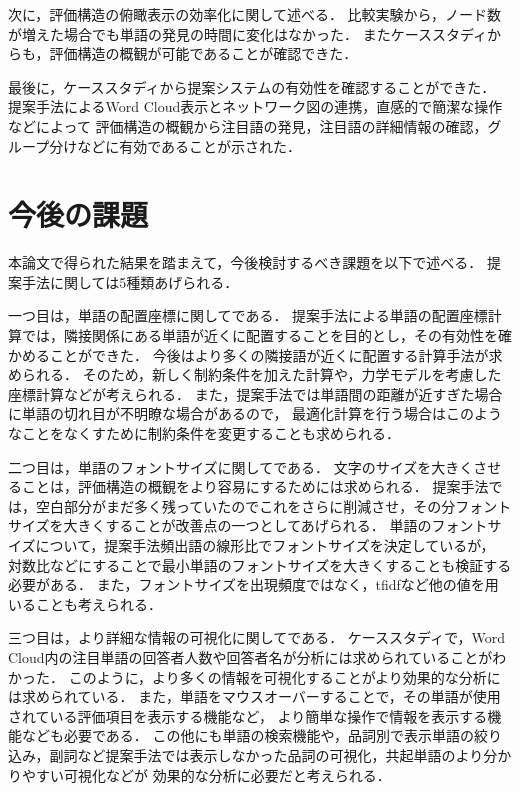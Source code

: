 \documentclass[syuuron]{kuee}
\begin{document}
		次に，評価構造の俯瞰表示の効率化に関して述べる．
		比較実験から，ノード数が増えた場合でも単語の発見の時間に変化はなかった．
		またケーススタディからも，評価構造の概観が可能であることが確認できた．
		
		最後に，ケーススタディから提案システムの有効性を確認することができた．
		提案手法によるWord Cloud表示とネットワーク図の連携，直感的で簡潔な操作などによって
		評価構造の概観から注目語の発見，注目語の詳細情報の確認，グループ分けなどに有効であることが示された．		
		
	\section{今後の課題}
		本論文で得られた結果を踏まえて，今後検討するべき課題を以下で述べる．
		提案手法に関しては5種類あげられる．
		
		一つ目は，単語の配置座標に関してである．
		提案手法による単語の配置座標計算では，隣接関係にある単語が近くに配置することを目的とし，その有効性を確かめることができた．
		今後はより多くの隣接語が近くに配置する計算手法が求められる．
		そのため，新しく制約条件を加えた計算や，力学モデルを考慮した座標計算などが考えられる．
		また，提案手法では単語間の距離が近すぎた場合に単語の切れ目が不明瞭な場合があるので，
		最適化計算を行う場合はこのようなことをなくすために制約条件を変更することも求められる．
		
		二つ目は，単語のフォントサイズに関してである．
		文字のサイズを大きくさせることは，評価構造の概観をより容易にするためには求められる．
		提案手法では，空白部分がまだ多く残っていたのでこれをさらに削減させ，その分フォントサイズを大きくすることが改善点の一つとしてあげられる．
		単語のフォントサイズについて，提案手法頻出語の線形比でフォントサイズを決定しているが，
		対数比などにすることで最小単語のフォントサイズを大きくすることも検証する必要がある．
		また，フォントサイズを出現頻度ではなく，tfidfなど他の値を用いることも考えられる．		
		
		三つ目は，より詳細な情報の可視化に関してである．
		ケーススタディで，Word Cloud内の注目単語の回答者人数や回答者名が分析には求められていることがわかった．
		このように，より多くの情報を可視化することがより効果的な分析には求められている．
		また，単語をマウスオーバーすることで，その単語が使用されている評価項目を表示する機能など，
		より簡単な操作で情報を表示する機能なども必要である．
		この他にも単語の検索機能や，品詞別で表示単語の絞り込み，副詞など提案手法では表示しなかった品詞の可視化，共起単語のより分かりやすい可視化などが
		効果的な分析に必要だと考えられる．
		
\end{document}
